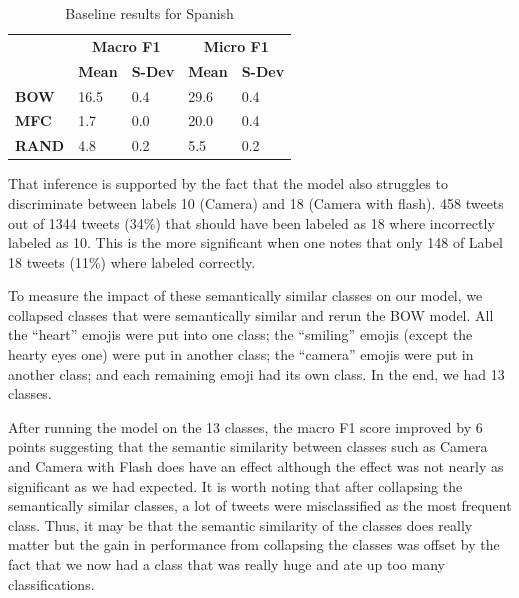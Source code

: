 \documentclass[11pt,a4paper]{article}
\begin{document}
\begin{table}[]
\centering

\begin{tabular}{@{}l|l|l|l|l|@{}}
\cmidrule(l){2-5}
                                    & \multicolumn{2}{c|}{\textbf{Macro F1}} & \multicolumn{2}{c|}{\textbf{Micro F1}} \\ \cmidrule(l){2-5} 
                                    & \textbf{Mean}     & \textbf{S-Dev}     & \textbf{Mean}     & \textbf{S-Dev}     \\ \midrule
\multicolumn{1}{|l|}{\textbf{BOW}}  & 16.5              & 0.4                & 29.6                & 0.4                 \\ \midrule
\multicolumn{1}{|l|}{\textbf{MFC}}  & 1.7               & 0.0                  & 20.0                & 0.4                 \\ \midrule
\multicolumn{1}{|l|}{\textbf{RAND}} & 4.8               & 0.2                & 5.5                & 0.2                 \\ \bottomrule
\end{tabular}
\caption{Baseline results for Spanish}
\label{table:baseline-es}
\end{table}


That inference is supported by the fact that the model also struggles to discriminate between labels 10 (Camera) and 18 (Camera with flash). 458 tweets out of 1344 tweets (34\%) that should have been labeled as 18 where incorrectly labeled as 10. This is the more significant when one notes that only 148 of Label 18 tweets (11\%) where labeled correctly. 

To measure the impact of these semantically similar classes on our model, we collapsed classes that were semantically similar and rerun the BOW model. All the “heart” emojis were put into one class; the “smiling” emojis (except the hearty eyes one) were put in another class; the “camera” emojis were put in another class; and each remaining emoji had its own class. In the end, we had 13 classes. 

After running the model on the 13 classes, the macro F1 score improved by 6 points suggesting that the semantic similarity between classes such as Camera and Camera with Flash does have an effect although the effect was not nearly as significant as we had expected. It is worth noting that after collapsing the semantically similar classes, a lot of tweets were misclassified as the most frequent class. Thus, it may be that the semantic similarity of the classes does really matter but the gain in performance from collapsing the classes was offset by the fact that we now had a class that was really huge and ate up too many classifications. 
\end{document}
